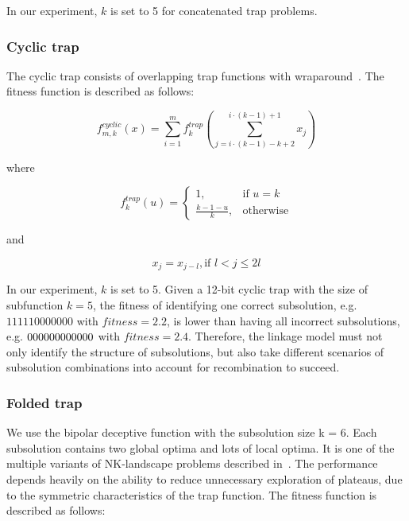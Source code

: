 \documentclass{sig-alternate-05-2015}
\begin{document}
In our experiment, $k$ is set to 5 for concatenated trap problems.


\subsubsection{Cyclic trap}
The cyclic trap consists of overlapping trap functions with wraparound~\cite{yu:overlapping}. The fitness function is described as follows:

\begin{displaymath}
f_{m,k}^{cyclic}(x) = \sum_{i=1}^{m} f_{k}^{trap} \left (\sum_{j = i\cdot(k-1)-k+2}^{i\cdot(k-1)+1} x_j\right )
\end{displaymath}

where

\begin{displaymath}
f_{k}^{trap}(u) = 
   \begin{cases}
    1, & \text{if $u=k$} \\
    \frac{k-1-u}{k}, & \text{otherwise}
	\end{cases}
\end{displaymath}

and

\begin{displaymath}
x_j = x_{j-l}, \text{if } l < j \leq 2l
\end{displaymath}

In our experiment, $k$ is set to 5.
Given a 12-bit cyclic trap with the size of subfunction $k = 5$, the fitness of identifying one correct subsolution, e.g. $111110000000$ with $fitness = 2.2$, is lower than having all incorrect subsolutions, e.g. $00000\\0000000$ with $fitness = 2.4$. Therefore, the linkage model  must not only identify the structure of subsolutions, but also take different scenarios of subsolution combinations into account for recombination to succeed.


\subsubsection{Folded trap}
We use the bipolar deceptive function with the subsolution size k = 6. Each subsolution contains two global optima and lots of local optima. It is one of the multiple variants of NK-landscape problems described in~\cite{goldberg:deception}. The performance depends heavily on the ability to reduce unnecessary exploration of plateaus, due to the symmetric characteristics of the trap function.  The fitness function is described as follows:
\end{document}
